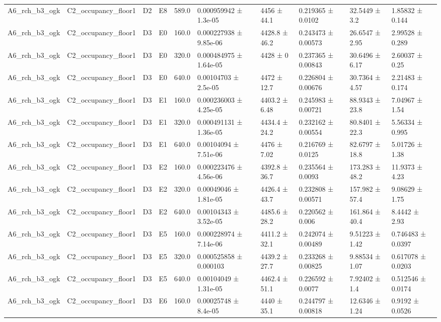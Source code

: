 \begin{table}
\begin{tabular}{llllllllll}
A6\_rch\_b3\_ogk & C2\_occupancy\_floor1 & D2 & E8 & 589.0 & 0.000959942 ± 1.3e-05 & 4456 ± 44.1 & 0.219365 ± 0.0102 & 32.5449 ± 3.2 & 1.85832 ± 0.144 \\
A6\_rch\_b3\_ogk & C2\_occupancy\_floor1 & D3 & E0 & 160.0 & 0.000227938 ± 9.85e-06 & 4428.8 ± 46.2 & 0.243473 ± 0.00573 & 26.6547 ± 2.95 & 2.99528 ± 0.289 \\
A6\_rch\_b3\_ogk & C2\_occupancy\_floor1 & D3 & E0 & 320.0 & 0.000484975 ± 1.64e-05 & 4428 ± 0 & 0.237365 ± 0.00843 & 30.6496 ± 6.17 & 2.60037 ± 0.25 \\
A6\_rch\_b3\_ogk & C2\_occupancy\_floor1 & D3 & E0 & 640.0 & 0.00104703 ± 2.5e-05 & 4472 ± 12.7 & 0.226804 ± 0.00676 & 30.7364 ± 4.57 & 2.21483 ± 0.174 \\
A6\_rch\_b3\_ogk & C2\_occupancy\_floor1 & D3 & E1 & 160.0 & 0.000236003 ± 4.25e-05 & 4403.2 ± 6.48 & 0.245983 ± 0.00721 & 88.9343 ± 23.8 & 7.04967 ± 1.54 \\
A6\_rch\_b3\_ogk & C2\_occupancy\_floor1 & D3 & E1 & 320.0 & 0.000491131 ± 1.36e-05 & 4434.4 ± 24.2 & 0.232162 ± 0.00554 & 80.8401 ± 22.3 & 5.56334 ± 0.995 \\
A6\_rch\_b3\_ogk & C2\_occupancy\_floor1 & D3 & E1 & 640.0 & 0.00104094 ± 7.51e-06 & 4476 ± 7.02 & 0.216769 ± 0.0125 & 82.6797 ± 18.8 & 5.01726 ± 1.38 \\
A6\_rch\_b3\_ogk & C2\_occupancy\_floor1 & D3 & E2 & 160.0 & 0.000223476 ± 4.56e-06 & 4392.8 ± 36.7 & 0.235564 ± 0.0093 & 173.283 ± 48.2 & 11.9373 ± 4.23 \\
A6\_rch\_b3\_ogk & C2\_occupancy\_floor1 & D3 & E2 & 320.0 & 0.00049046 ± 1.81e-05 & 4426.4 ± 43.7 & 0.232808 ± 0.00571 & 157.982 ± 57.4 & 9.08629 ± 1.75 \\
A6\_rch\_b3\_ogk & C2\_occupancy\_floor1 & D3 & E2 & 640.0 & 0.00104343 ± 3.52e-05 & 4485.6 ± 28.2 & 0.220562 ± 0.006 & 161.864 ± 40.4 & 8.4442 ± 2.93 \\
A6\_rch\_b3\_ogk & C2\_occupancy\_floor1 & D3 & E5 & 160.0 & 0.000228974 ± 7.14e-06 & 4411.2 ± 32.1 & 0.242074 ± 0.00489 & 9.51223 ± 1.42 & 0.746483 ± 0.0397 \\
A6\_rch\_b3\_ogk & C2\_occupancy\_floor1 & D3 & E5 & 320.0 & 0.000525858 ± 0.000103 & 4439.2 ± 27.7 & 0.233268 ± 0.00825 & 9.88534 ± 1.07 & 0.617078 ± 0.0203 \\
A6\_rch\_b3\_ogk & C2\_occupancy\_floor1 & D3 & E5 & 640.0 & 0.00104049 ± 1.31e-05 & 4462.4 ± 51.1 & 0.226592 ± 0.0077 & 7.92402 ± 1.4 & 0.512546 ± 0.0174 \\
A6\_rch\_b3\_ogk & C2\_occupancy\_floor1 & D3 & E6 & 160.0 & 0.00025748 ± 8.4e-05 & 4440 ± 35.1 & 0.244797 ± 0.00818 & 12.6346 ± 1.24 & 0.9192 ± 0.0526 \\

\end{tabular}
\end{table}
